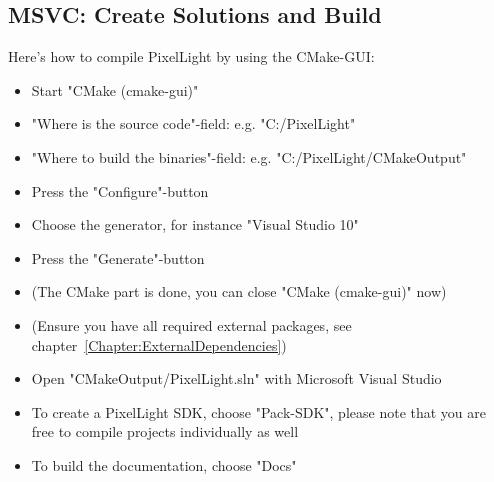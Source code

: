\subsection{MSVC: Create Solutions and Build}
Here's how to compile PixelLight by using the CMake-GUI:
\begin{itemize}
\item{Start "CMake (cmake-gui)"}
\item{"Where is the source code"-field: e.g. "C:/PixelLight"}
\item{"Where to build the binaries"-field: e.g. "C:/PixelLight/CMakeOutput"}
\item{Press the "Configure"-button}
\item{Choose the generator, for instance "Visual Studio 10"}
\item{Press the "Generate"-button}
\item{(The CMake part is done, you can close "CMake (cmake-gui)" now)}
\item{(Ensure you have all required external packages, see chapter~\ref{Chapter:ExternalDependencies})}
\item{Open "CMakeOutput/PixelLight.sln" with Microsoft Visual Studio}
\item{To create a PixelLight SDK, choose "Pack-SDK", please note that you are free to compile projects individually as well}
\item{To build the documentation, choose "Docs"}
\end{itemize}
